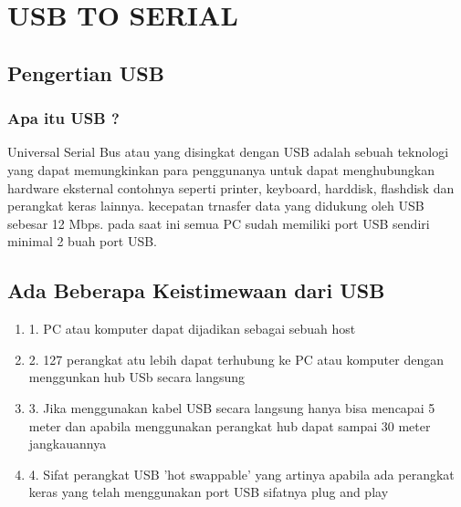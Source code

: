 
\section {USB TO SERIAL}

\subsection {Pengertian USB}
\subsubsection {Apa itu USB ?}
	Universal Serial Bus atau yang disingkat dengan USB adalah sebuah teknologi yang dapat memungkinkan para penggunanya untuk dapat menghubungkan hardware eksternal contohnya seperti printer, keyboard, harddisk, flashdisk dan perangkat keras lainnya. kecepatan trnasfer data yang didukung oleh USB sebesar 12 Mbps. pada saat ini semua PC sudah memiliki port USB sendiri minimal 2 buah port USB.

\subsection {Ada Beberapa Keistimewaan dari USB}
\begin {enumerate}
\item
1. PC atau komputer dapat dijadikan sebagai sebuah host
\item
2. 127 perangkat atu lebih dapat terhubung ke PC atau komputer dengan menggunkan hub USb secara langsung
\item
3. Jika menggunakan kabel USB secara langsung hanya bisa mencapai 5 meter dan apabila menggunakan perangkat hub dapat sampai 30 meter jangkauannya
\item
4. Sifat perangkat USB 'hot swappable' yang artinya apabila ada perangkat keras yang telah menggunakan port USB sifatnya plug and play
\end {enumerate}

